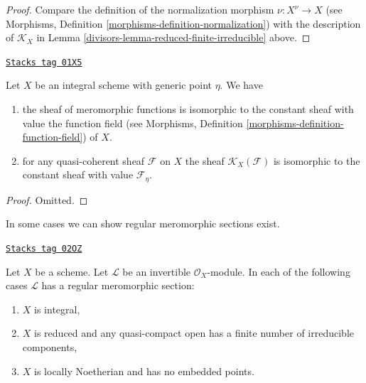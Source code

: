 \begin{proof}

Compare the definition of the normalization morphism
$\nu : X^\nu \to X$ (see
Morphisms, Definition \ref{morphisms-definition-normalization})
with the description of $\mathcal{K}_X$ in
Lemma \ref{divisors-lemma-reduced-finite-irreducible} above.
\end{proof}

\begin{lemma}
\label{divisors-lemma-meromorphic-functions-integral-scheme}
\href{https://stacks.math.columbia.edu/tag/01X5}{\texttt{Stacks tag 01X5}}

Let $X$ be an integral scheme with generic point $\eta$. We have
\begin{enumerate}
\item the sheaf of meromorphic functions is
isomorphic to the constant sheaf with value the
function field (see
Morphisms, Definition \ref{morphisms-definition-function-field})
of $X$.
\item for any quasi-coherent sheaf $\mathcal{F}$ on $X$ the
sheaf $\mathcal{K}_X(\mathcal{F})$ is isomorphic to the
constant sheaf with value $\mathcal{F}_\eta$.
\end{enumerate}
\end{lemma}

\begin{proof}
Omitted.
\end{proof}

In some cases we can show regular meromorphic sections exist.

\begin{lemma}
\label{divisors-lemma-regular-meromorphic-section-exists}
\href{https://stacks.math.columbia.edu/tag/02OZ}{\texttt{Stacks tag 02OZ}}

Let $X$ be a scheme.
Let $\mathcal{L}$ be an invertible $\mathcal{O}_X$-module.
In each of the following cases $\mathcal{L}$ has a regular meromorphic
section:
\begin{enumerate}
\item $X$ is integral,
\item $X$ is reduced and any quasi-compact open has a finite
number of irreducible components,
\item $X$ is locally Noetherian and has no embedded points.
\end{enumerate}
\end{lemma}

